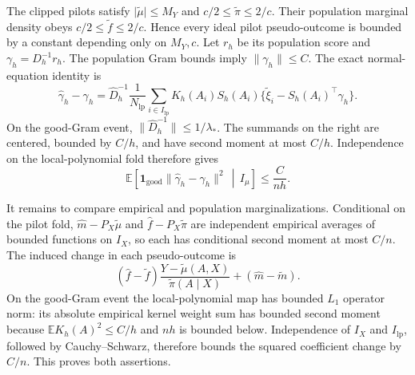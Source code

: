 The clipped pilots satisfy \(\lvert\widetilde\mu\rvert\le M_Y\) and \(c/2\le\widetilde\pi\le2/c\). Their population marginal density obeys \(c/2\le\widetilde f\le2/c\). Hence every ideal pilot pseudo-outcome is bounded by a constant depending only on \(M_Y,c\). Let \(r_h\) be its population score and \(\gamma_h=D_h^{-1}r_h\). The population Gram bounds imply \(\lVert\gamma_h\rVert\le C\). The exact normal-equation identity is
\[
\widehat\gamma_h-\gamma_h
=\widehat D_h^{-1}\frac1{N_{\mathrm{lp}}}\sum_{i\in I_{\mathrm{lp}}}K_h(A_i)S_h(A_i)\{\widetilde\xi_i-S_h(A_i)^\top\gamma_h\}.
\]
On the good-Gram event, \(\lVert\widehat D_h^{-1}\rVert\le1/\lambda_*\). The summands on the right are centered, bounded by \(C/h\), and have second moment at most \(C/h\). Independence on the local-polynomial fold therefore gives
\[
\mathbb E\!\left[\mathbf1_{\mathrm{good}}\lVert\widehat\gamma_h-\gamma_h\rVert^2\,\middle|\,I_\mu\right]\le\frac{C}{nh}.
\]

It remains to compare empirical and population marginalizations. Conditional on the pilot fold, \(\widehat m-P_X\widetilde\mu\) and \(\widehat f-P_X\widetilde\pi\) are independent empirical averages of bounded functions on \(I_X\), so each has conditional second moment at most \(C/n\). The induced change in each pseudo-outcome is
\[
(\widehat f-\widetilde f)\frac{Y-\widetilde\mu(A,X)}{\widetilde\pi(A\mid X)}+(\widehat m-\widetilde m).
\]
On the good-Gram event the local-polynomial map has bounded \(L_1\) operator norm: its absolute empirical kernel weight sum has bounded second moment because \(\mathbb E K_h(A)^2\le C/h\) and \(nh\) is bounded below. Independence of \(I_X\) and \(I_{\mathrm{lp}}\), followed by Cauchy--Schwarz, therefore bounds the squared coefficient change by \(C/n\). This proves both assertions.